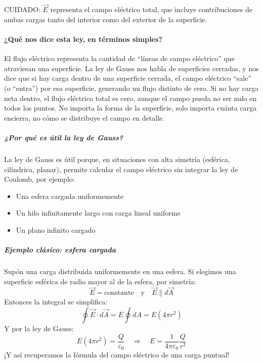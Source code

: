 \begin{tcolorbox}[mydanger]
    CUIDADO: \(\vec{E}\) representa el campo eléctrico total, que incluye contribuciones de ambas cargas tanto del interior como del exterior de la superficie.    
\end{tcolorbox}

\paragraph{¿Qué nos dice esta ley, en términos simples?}

El flujo eléctrico representa la cantidad de ``líneas de campo eléctrico'' que atraviesan una superficie. La ley de Gauss nos habla de superficies cerradas, y nos dice que si hay carga dentro de una superficie cerrada, el campo eléctrico ``sale'' (o ``entra'') por esa superficie, generando un flujo distinto de cero. Si no hay carga neta dentro, el flujo eléctrico total es cero, aunque el campo pueda no ser nulo en todos los puntos. No importa la forma de la superficie, solo importa cuánta carga encierra, no cómo se distribuye el campo en detalle.

\subparagraph{¿Por qué es útil la ley de Gauss?}

La ley de Gauss es útil porque, en situaciones con alta simetría (esférica, cilíndrica, planar), permite calcular el campo eléctrico sin integrar la ley de Coulomb, por ejemplo:
\begin{itemize}
    \item Una esfera cargada uniformemente
    \item Un hilo infinitamente largo con carga lineal uniforme
    \item Un plano infinito cargado
\end{itemize}

\subparagraph{Ejemplo clásico: esfera cargada}

Supón una carga distribuida uniformemente en una esfera. Si elegimos una superficie esférica de radio  mayor al de la esfera, por simetría:
\[
\vec{E} = \text{constante} \quad \text{y} \quad \vec{E} \parallel d\vec{A}
\]
Entonces la integral se simplifica:
\[
\oint \vec{E} \cdot d\vec{A} = E \oint dA = E(4\pi r^2)
\]
Y por la ley de Gauss:
\[
E(4\pi r^2) = \frac{Q}{\varepsilon_0} \quad \Rightarrow \quad E = \frac{1}{4\pi\varepsilon_0} \frac{Q}{r^2}
\]
¡Y así recuperamos la fórmula del campo eléctrico de una carga puntual!